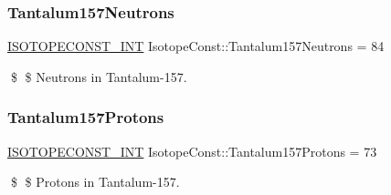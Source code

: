 \subsubsection{\texorpdfstring{Tantalum157\+Neutrons}{Tantalum157Neutrons}}
{\footnotesize\ttfamily \mbox{\hyperlink{group___isotope_const-_macros_ga5f18360b3e99483a35c32d789e62621c}{I\+S\+O\+T\+O\+P\+E\+C\+O\+N\+S\+T\+\_\+\+I\+NT}} Isotope\+Const\+::\+Tantalum157\+Neutrons = 84}

\$ \$ Neutrons in Tantalum-\/157. \mbox{\label{group___isotope_const-_tantalum-_ta157_gab4fbc2c4ad7e1e7d5d71f15d35fc5417}} 
\subsubsection{\texorpdfstring{Tantalum157\+Protons}{Tantalum157Protons}}
{\footnotesize\ttfamily \mbox{\hyperlink{group___isotope_const-_macros_ga5f18360b3e99483a35c32d789e62621c}{I\+S\+O\+T\+O\+P\+E\+C\+O\+N\+S\+T\+\_\+\+I\+NT}} Isotope\+Const\+::\+Tantalum157\+Protons = 73}

\$ \$ Protons in Tantalum-\/157. 